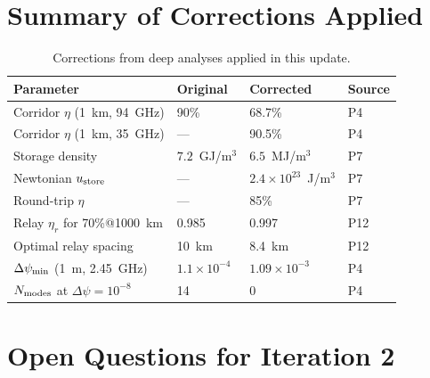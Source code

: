 \documentclass[aps,prd,twocolumn,superscriptaddress]{revtex4-2}
\begin{document}
\section{Summary of Corrections Applied}
\label{sec:corrections}

\begin{table}[h]
\caption{Corrections from deep analyses applied in this update.}
\label{tab:corrections}
\begin{ruledtabular}
\begin{tabular}{llll}
Parameter & Original & Corrected & Source \\
\hline
Corridor $\eta$ (1~km, 94~GHz) & 90\% & 68.7\% & P4 \\
Corridor $\eta$ (1~km, 35~GHz) & --- & 90.5\% & P4 \\
Storage density & $7.2$~GJ/m$^3$ & $6.5$~MJ/m$^3$ & P7 \\
Newtonian $u_{\rm store}$ & --- & $2.4\times 10^{23}$~J/m$^3$ & P7 \\
Round-trip $\eta$ & --- & 85\% & P7 \\
Relay $\eta_r$ for 70\%@1000~km & 0.985 & 0.997 & P12 \\
Optimal relay spacing & 10~km & 8.4~km & P12 \\
$\Delta\psi_{\rm min}$ (1~m, 2.45~GHz) & $1.1\times 10^{-4}$ & $1.09\times 10^{-3}$ & P4 \\
$N_{\rm modes}$ at $\Delta\psi = 10^{-8}$ & 14 & 0 & P4 \\
\end{tabular}
\end{ruledtabular}
\end{table}

\section{Open Questions for Iteration 2}
\label{sec:open}
\end{document}
